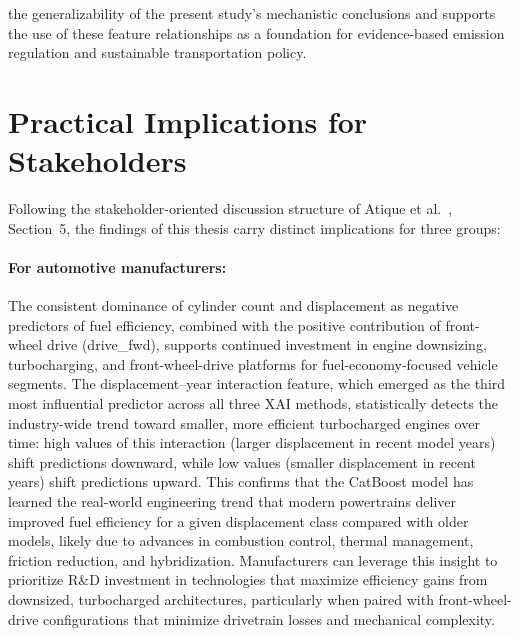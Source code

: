 the generalizability of the present study's mechanistic conclusions and supports the use of these feature relationships as a foundation for evidence-based emission regulation and sustainable transportation policy.


\section{Practical Implications for Stakeholders}

Following the stakeholder-oriented discussion structure of Atique et al.~\cite{atique2026explainable}, Section~5, the findings of this thesis carry distinct implications for three groups:

\paragraph{For automotive manufacturers:}
The consistent dominance of cylinder count and displacement as negative predictors of fuel efficiency, combined with the positive contribution of front-wheel drive (drive\_fwd), supports continued investment in engine downsizing, turbocharging, and front-wheel-drive platforms for fuel-economy-focused vehicle segments. The displacement--year interaction feature, which emerged as the third most influential predictor across all three XAI methods, statistically detects the industry-wide trend toward smaller, more efficient turbocharged engines over time: high values of this interaction (larger displacement in recent model years) shift predictions downward, while low values (smaller displacement in recent years) shift predictions upward. This confirms that the CatBoost model has learned the real-world engineering trend that modern powertrains deliver improved fuel efficiency for a given displacement class compared with older models, likely due to advances in combustion control, thermal management, friction reduction, and hybridization. Manufacturers can leverage this insight to prioritize R\&D investment in technologies that maximize efficiency gains from downsized, turbocharged architectures, particularly when paired with front-wheel-drive configurations that minimize drivetrain losses and mechanical complexity.

